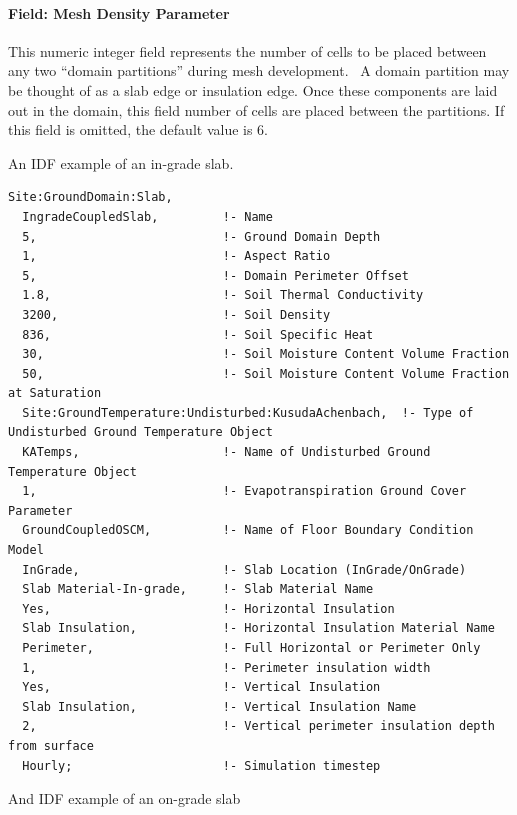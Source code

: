 \paragraph{Field: Mesh Density Parameter}

This numeric integer field represents the number of cells to be placed between any two ``domain partitions'' during mesh development.~ A domain partition may be thought of as a slab edge or insulation edge. Once these components are laid out in the domain, this field number of cells are placed between the partitions. If this field is omitted, the default value is 6.

An IDF example of an in-grade slab.

\begin{lstlisting}
Site:GroundDomain:Slab,
  IngradeCoupledSlab,         !- Name
  5,                          !- Ground Domain Depth
  1,                          !- Aspect Ratio
  5,                          !- Domain Perimeter Offset
  1.8,                        !- Soil Thermal Conductivity
  3200,                       !- Soil Density
  836,                        !- Soil Specific Heat
  30,                         !- Soil Moisture Content Volume Fraction
  50,                         !- Soil Moisture Content Volume Fraction at Saturation
  Site:GroundTemperature:Undisturbed:KusudaAchenbach,  !- Type of Undisturbed Ground Temperature Object
  KATemps,                    !- Name of Undisturbed Ground Temperature Object
  1,                          !- Evapotranspiration Ground Cover Parameter
  GroundCoupledOSCM,          !- Name of Floor Boundary Condition Model
  InGrade,                    !- Slab Location (InGrade/OnGrade)
  Slab Material-In-grade,     !- Slab Material Name
  Yes,                        !- Horizontal Insulation
  Slab Insulation,            !- Horizontal Insulation Material Name
  Perimeter,                  !- Full Horizontal or Perimeter Only
  1,                          !- Perimeter insulation width
  Yes,                        !- Vertical Insulation
  Slab Insulation,            !- Vertical Insulation Name
  2,                          !- Vertical perimeter insulation depth from surface
  Hourly;                     !- Simulation timestep
\end{lstlisting}

And IDF example of an on-grade slab

